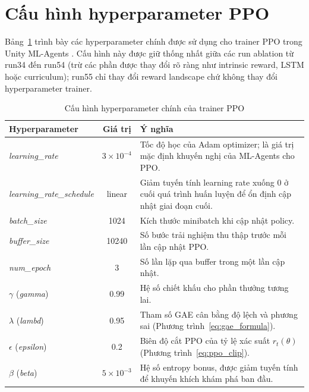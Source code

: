 \section{Cấu hình hyperparameter PPO}

Bảng~\ref{tab:ppo_hyperparams} trình bày các hyperparameter chính được sử dụng cho trainer PPO trong Unity ML-Agents \cite{Juliani2018}. Cấu hình này được giữ thống nhất giữa các run ablation từ run34 đến run54 (trừ các phần được thay đổi rõ ràng như intrinsic reward, LSTM hoặc curriculum); run55 chỉ thay đổi reward landscape chứ không thay đổi hyperparameter trainer.

\begin{table}[H]
    \centering
    \small
    \caption{Cấu hình hyperparameter chính của trainer PPO}
    \label{tab:ppo_hyperparams}
    \begin{tabular}{|p{4.0cm}|c|p{7.2cm}|}
        \hline
        \textbf{Hyperparameter} & \textbf{Giá trị} & \textbf{Ý nghĩa} \\
        \hline
        \emph{learning\_rate}      & $3{\times}10^{-4}$ & Tốc độ học của Adam optimizer; là giá trị mặc định khuyến nghị của ML-Agents cho PPO. \\
        \hline
        \emph{learning\_rate\_schedule} & linear & Giảm tuyến tính learning rate xuống 0 ở cuối quá trình huấn luyện để ổn định cập nhật giai đoạn cuối. \\
        \hline
        \emph{batch\_size}         & 1024  & Kích thước minibatch khi cập nhật policy. \\
        \hline
        \emph{buffer\_size}        & 10240 & Số bước trải nghiệm thu thập trước mỗi lần cập nhật PPO. \\
        \hline
        \emph{num\_epoch}          & 3     & Số lần lặp qua buffer trong một lần cập nhật. \\
        \hline
        $\gamma$ (\emph{gamma})    & 0.99  & Hệ số chiết khấu cho phần thưởng tương lai. \\
        \hline
        $\lambda$ (\emph{lambd})   & 0.95  & Tham số GAE cân bằng độ lệch và phương sai (Phương trình~\ref{eq:gae_formula}). \\
        \hline
        $\epsilon$ (\emph{epsilon})& 0.2   & Biên độ cắt PPO của tỷ lệ xác suất $r_t(\theta)$ (Phương trình~\ref{eq:ppo_clip}). \\
        \hline
        $\beta$ (\emph{beta})      & $5{\times}10^{-3}$ & Hệ số entropy bonus, được giảm tuyến tính để khuyến khích khám phá ban đầu. \\

\end{tabular}
\end{table}

